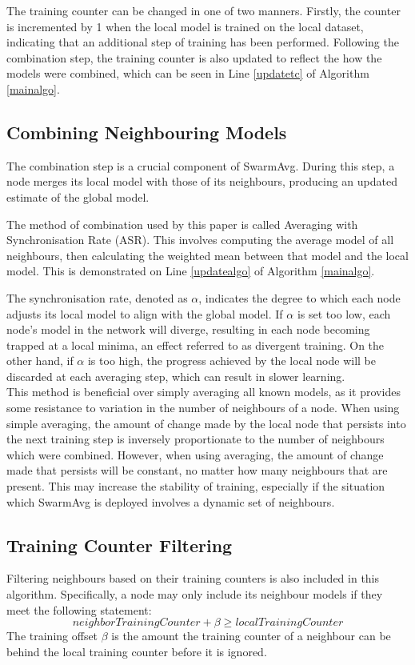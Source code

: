 \documentclass[letterpaper, 10 pt, conference]{ieeeconf}  %
\begin{document}
The training counter can be changed in one of two manners. Firstly, the counter is incremented by 1 when the local model is trained on the local dataset, indicating that an additional step of training has been performed. Following the combination step, the training counter is also updated to reflect the how the models were combined, which can be seen in Line \ref{updatetc} of Algorithm \ref{mainalgo}.

\subsection{Combining Neighbouring Models} \label{mcm}
The combination step is a crucial component of SwarmAvg. During this step, a node merges its local model with those of its neighbours, producing an updated estimate of the global model.

The method of combination used by this paper is called Averaging with Synchronisation Rate (ASR). This involves computing the average model of all neighbours, then calculating the weighted mean between that model and the local model. This is demonstrated on Line \ref{updatealgo} of Algorithm \ref{mainalgo}.

The synchronisation rate, denoted as $\alpha$, indicates the degree to which each node adjusts its local model to align with the global model. If $\alpha$ is set too low, each node's model in the network will diverge, resulting in each node becoming trapped at a local minima, an effect referred to as divergent training. On the other hand, if $\alpha$ is too high, the progress achieved by the local node will be discarded at each averaging step, which can result in slower learning. \\

This method is beneficial over simply averaging all known models, as it provides some resistance to variation in the number of neighbours of a node. When using simple averaging, the amount of change made by the local node that persists into the next training step is inversely proportionate to the number of neighbours which were combined. However, when using averaging, the amount of change made that persists will be constant, no matter how many neighbours that are present. This may increase the stability of training, especially if the situation which SwarmAvg is deployed involves a dynamic set of neighbours.

\subsection{Training Counter Filtering}
Filtering neighbours based on their training counters is also included in this algorithm. Specifically, a node may only include its neighbour models if they meet the following statement:
\[neighborTrainingCounter + \beta \ge localTrainingCounter \]
The training offset $\beta$ is the amount the training counter of a neighbour can be behind the local training counter before it is ignored. \\
\end{document}
